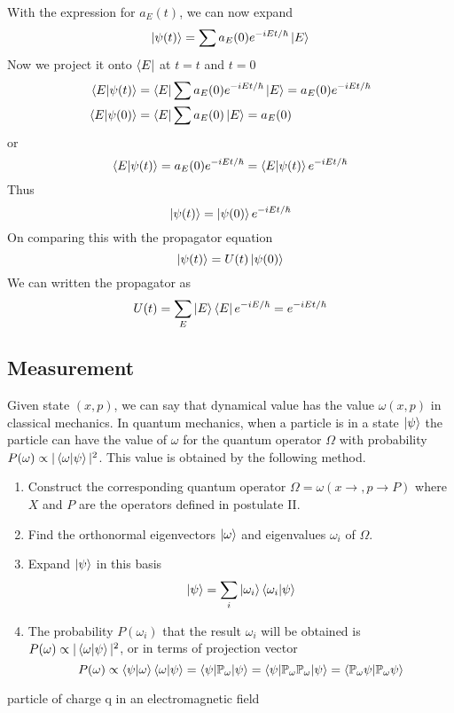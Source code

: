 \documentclass[../../../main.tex]{subfiles}
\begin{document}
With the expression for $a_E(t)$, we can now expand 
\begin{equation*}
    \ket{\psi(t)}=\sum a_E(0)e^{-i E t/\hbar}\ket{E}
\end{equation*}
Now we project it onto $\bra{E }$ at $t=t$ and $t=0$
\begin{align*}
    \braket{E|\psi(t)}&= \bra{E }\sum a_E(0)e^{-i E t/\hbar}\ket{E}=a_E(0)e^{-i Et/\hbar}\\
    \braket{E|\psi(0)}&= \bra{E }\sum a_E(0)\ket{E}=a_E(0)
\end{align*}
or 
\begin{equation*}
    \braket{E|\psi(t)}=a_E(0)e^{-i Et/\hbar}=\braket{E|\psi(t)}e^{-iEt/\hbar}
\end{equation*}
Thus 
\begin{equation*}
    \ket{\psi(t)}=\ket{\psi(0)}e^{-iEt/\hbar}
\end{equation*}
On comparing this with the propagator equation
\begin{equation*}
    \ket{\psi(t)}=U(t)\ket{\psi(0)}    
\end{equation*}
We can written the propagator as 
\begin{equation*}
    U(t)=\sum_E \ket{E }\bra{E }e^{-iE/\hbar}=e^{-iEt/\hbar}
\end{equation*}

\subsection{Measurement}
Given state $(x,p)$, we can say that dynamical value has the value $\omega(x,p)$ in classical mechanics.
In quantum mechanics, when a particle is in a state $\ket{\psi } $ the particle can have the value of $\omega$ for the quantum operator $\Omega$ with probability $P(\omega)\propto|\braket{\omega|\psi}  |^2$. 
This value is obtained by the following method.
\begin{enumerate}
    \item Construct the corresponding quantum operator $\Omega=\omega(x \rightarrow ,p \rightarrow P)$ where $X$ and $P$ are the operators defined in postulate II.
    \item Find the orthonormal eigenvectors $\ket{\omega} $ and eigenvalues $\omega_i$ of $\Omega$.
    \item Expand $\ket{\psi } $ in this basis
    \begin{equation*}
        \ket{\psi }=\sum_i  \ket{\omega_i } \braket{\omega_i |\psi}  
    \end{equation*}
    \item The probability $P(\omega_i)$ that the result $\omega_i$ will be obtained is $P(\omega)\propto|\braket{\omega|\psi}  |^2$, or in terms of projection vector
    \begin{equation*}
        P(\omega)\propto \braket{\psi|\omega } \braket{\omega|\psi}=\braket{\psi|\mathbb{P}_\omega|\psi  }=\braket{\psi|\mathbb{P } _\omega \mathbb{P } _\omega |\psi   }=\braket{\mathbb{P } _\omega \psi| \mathbb{P } _\omega \psi  }    
    \end{equation*}
\end{enumerate}
particle of charge q in an electromagnetic field
\end{document}
